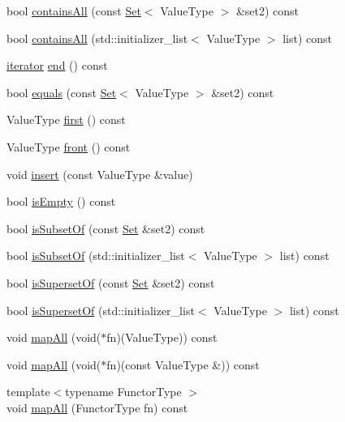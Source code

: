 \begin{DoxyCompactItemize}
\item 
bool \mbox{\hyperlink{classSet_aecb715578d40d725c26968216b1cfaf7}{contains\+All}} (const \mbox{\hyperlink{classSet}{Set}}$<$ Value\+Type $>$ \&set2) const
\item 
bool \mbox{\hyperlink{classSet_ab1015353723ba6d764f48aeceeff5799}{contains\+All}} (std\+::initializer\+\_\+list$<$ Value\+Type $>$ list) const
\item 
\mbox{\hyperlink{classSet_1_1iterator}{iterator}} \mbox{\hyperlink{classSet_a68b688a51bd0cf6fb5bc2cba292209a8}{end}} () const
\item 
bool \mbox{\hyperlink{classSet_a1d3d3137e38441eab9f56a979201c385}{equals}} (const \mbox{\hyperlink{classSet}{Set}}$<$ Value\+Type $>$ \&set2) const
\item 
Value\+Type \mbox{\hyperlink{classSet_aaeecd3ae022dd6b19df936718f4ab831}{first}} () const
\item 
Value\+Type \mbox{\hyperlink{classSet_abaa174a9d74f7e7e38d4944fa43b5a33}{front}} () const
\item 
void \mbox{\hyperlink{classSet_ad2b89af3c836e14eecca0f9a4b4d6721}{insert}} (const Value\+Type \&value)
\item 
bool \mbox{\hyperlink{classSet_acf82f9b2937375c7b1cf3dccb3df3312}{is\+Empty}} () const
\item 
bool \mbox{\hyperlink{classSet_a0eeb19f1a4d1082c596485f562b27dd5}{is\+Subset\+Of}} (const \mbox{\hyperlink{classSet}{Set}} \&set2) const
\item 
bool \mbox{\hyperlink{classSet_a4d0c68e90ea31896c3c74b8d8a066db2}{is\+Subset\+Of}} (std\+::initializer\+\_\+list$<$ Value\+Type $>$ list) const
\item 
bool \mbox{\hyperlink{classSet_a336437a644c2368edfb873b5f9c4a77a}{is\+Superset\+Of}} (const \mbox{\hyperlink{classSet}{Set}} \&set2) const
\item 
bool \mbox{\hyperlink{classSet_ad715481e7f266fb44aa3fa9f447cd4fe}{is\+Superset\+Of}} (std\+::initializer\+\_\+list$<$ Value\+Type $>$ list) const
\item 
void \mbox{\hyperlink{classSet_a2931bda025b4800f128f37790d21f49f}{map\+All}} (void($\ast$fn)(Value\+Type)) const
\item 
void \mbox{\hyperlink{classSet_a395b81e6a77aa9702362198771785dfd}{map\+All}} (void($\ast$fn)(const Value\+Type \&)) const
\item 
{\footnotesize template$<$typename Functor\+Type $>$ }\\void \mbox{\hyperlink{classSet_a8dc32c1e45704cfae41daf8adb4e66dc}{map\+All}} (Functor\+Type fn) const

\end{DoxyCompactItemize}
